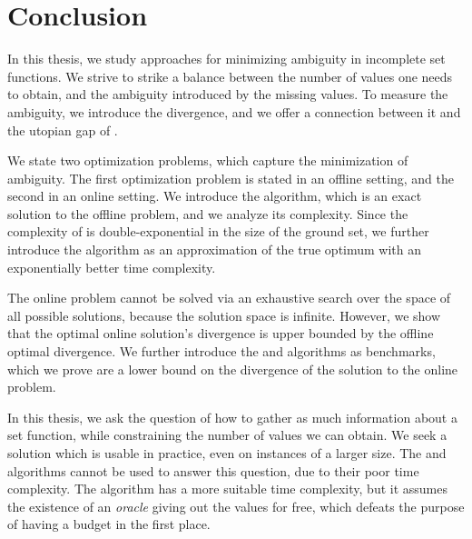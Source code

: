 \chapter*{Conclusion}

In this thesis, we study approaches for minimizing ambiguity in incomplete set functions.
We strive to strike a balance between the number of values one needs to obtain, and the ambiguity introduced by the missing values.
To measure the ambiguity, we introduce the divergence, and we offer a connection between it and the utopian gap of \cite{uradnik2024reducing}.

We state two optimization problems, which capture the minimization of ambiguity.
The first optimization problem is stated in an offline setting, and the second in an online setting.
We introduce the \algFO{} algorithm, which is an exact solution to the offline problem, and we analyze its complexity.
Since the complexity of \algFO{} is double-exponential in the size of the ground set, we further introduce the \algFG{} algorithm as an approximation of the true optimum with an exponentially better time complexity.

The online problem cannot be solved via an exhaustive search over the space of all possible solutions, because the solution space is infinite.
However, we show that the optimal online solution's divergence is upper bounded by the offline optimal divergence.
We further introduce the \algRO{} and \algRG{} algorithms as benchmarks, which we prove are a lower bound on the divergence of the solution to the online problem.

In this thesis, we ask the question of how to gather as much information about a set function, while constraining the number of values we can obtain.
We seek a solution which is usable in practice, even on instances of a larger size.
The \algFO{} and \algRO{} algorithms cannot be used to answer this question, due to their poor time complexity.
The \algRG{} algorithm has a more suitable time complexity, but it assumes the existence of an \emph{oracle} giving out the values for free, which defeats the purpose of having a budget in the first place.

